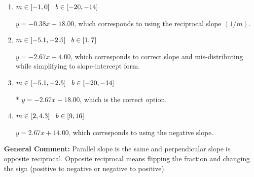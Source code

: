 \documentclass{extbook}[14pt]
\begin{document}
\begin{enumerate}
{\begin{enumerate}[label=\Alph*.]
 $y = -2.67x + 18.00$, which corresponds to using the correct slope and getting the negative $y$-intercept.
\item \( m \in [-1, 0] \hspace*{3mm} b \in [-20, -14] \)

 $y = -0.38x - 18.00$, which corresponds to using the reciprocal slope $(1/m)$.
\item \( m \in [-5.1, -2.5] \hspace*{3mm} b \in [1, 7] \)

 $y = -2.67x + 4.00$, which corresponds to correct slope and mis-distributing while simplifying to slope-intercept form.
\item \( m \in [-5.1, -2.5] \hspace*{3mm} b \in [-20, -14] \)

* $y = -2.67x - 18.00$, which is the correct option.
\item \( m \in [2, 4.3] \hspace*{3mm} b \in [9, 16] \)

 $y = 2.67x + 14.00$, which corresponds to using the negative slope.
\end{enumerate}

\textbf{General Comment:} Parallel slope is the same and perpendicular slope is opposite reciprocal. Opposite reciprocal means flipping the fraction and changing the sign (positive to negative or negative to positive).
}
\end{enumerate}
\end{document}

